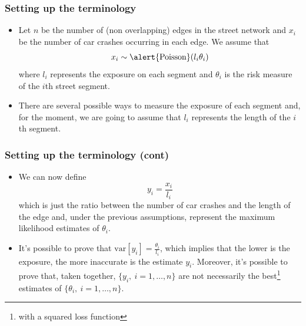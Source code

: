 \documentclass[c,10pt,pdftex]{beamer}
\begin{document}
\begin{frame}
\frametitle{Setting up the terminology}
\vspace{-0.75cm}
\begin{itemize}
	\setlength\itemsep{1em}
	\item  Let $n$ be the number of (non overlapping) edges in the street network and $x_i$ be the number of car crashes occurring in each edge. We assume that
	\[
	x_i \sim \alert{\text{Poisson}}(l_i\theta_i)
	\] 	
	where $l_i$ represents the \alert{exposure} on each segment and $\theta_i$ is the \alert{risk measure of the $i$th street segment}. 
	\item There are several possible ways to measure the exposure of each segment and, for the moment, we are going to assume that $l_i$ represents the length of the $i$th segment. 
\end{itemize}
\end{frame}

\begin{frame}
\frametitle{Setting up the terminology (cont)}
\vspace{-0.75cm}
\begin{itemize}
	\setlength\itemsep{1em}
	\item We can now define 
	\[
	y_{i} = \frac{x_i}{l_i}
	\]  
	which is just the ratio between the number of car crashes and the length of the edge and, under the previous assumptions, represent the maximum likelihood estimates of $\theta_i$. 
	
	
	\item It's possible to prove that $\text{var}[y_i] = \frac{\theta_i}{l_i}$, which implies that the lower is the exposure, the more inaccurate is the estimate $y_i$. Moreover, it's possible to prove that, taken together, $\lbrace y_i, \ i = 1,\dots,n\rbrace$ are not necessarily the best\footnote{with a squared loss function} estimates of $\lbrace \theta_i, \ i = 1, \dots, n \rbrace$.   
\end{itemize}
\end{frame}
\end{document}
